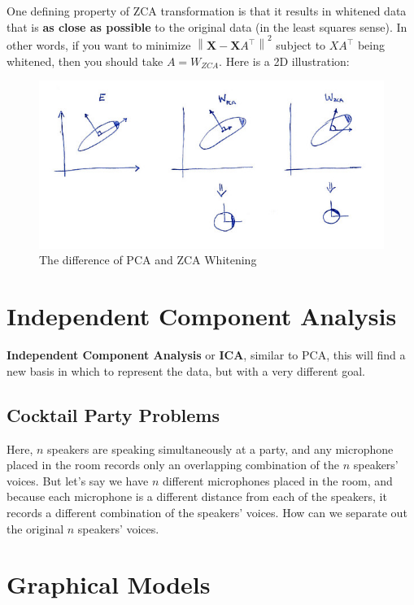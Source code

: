 \documentclass[a3paper, 12pt]{book} %
\begin{document}
One defining property of ZCA transformation is that it results in whitened data that is \textbf{as close as possible} to the original data (in the least squares sense). In other words, if you want to minimize $\left\lVert \mathbf{X}-\mathbf{X}A^\top \right\rVert^2$ subject to $XA^\top$ being whitened, then you should take $A=W_{ZCA}$. Here is a 2D illustration:

\begin{figure}[htpb]
	\centering
	\includegraphics[width=\linewidth]{figures/zca.jpg}
	\caption{The difference of PCA and ZCA Whitening}
	\label{fig:boat1}
\end{figure}


\chapter{Independent Component Analysis}
\textbf{Independent Component Analysis} or \textbf{ICA}, similar to PCA, this will find a new basis in which to represent the data, but with a very different goal.

\section{Cocktail Party Problems}
Here, $n$ speakers are speaking simultaneously at a party, and any microphone placed in the room records only an overlapping combination of the $n$ speakers' voices. But let's say we have $n$ different microphones placed in the room, and because each microphone is a different distance from each of the speakers, it records a different combination of the speakers' voices. How can we separate out the original $n$ speakers' voices.


\chapter{Graphical Models}
\end{document}
